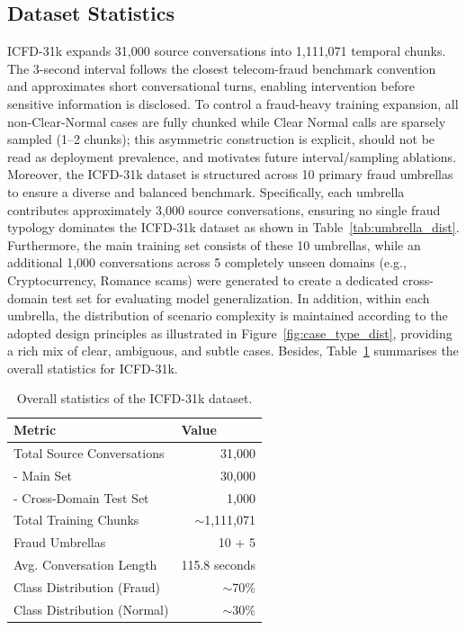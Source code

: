 \documentclass{article}
\newcommand{\crchange}[1]{{\color{blue}#1}}
\begin{document}
\subsection{Dataset Statistics}
\crchange{ICFD-31k expands 31,000 source conversations into 1,111,071 temporal chunks. The 3-second interval follows the closest telecom-fraud benchmark convention~\cite{Ma2025} and approximates short conversational turns, enabling intervention before sensitive information is disclosed. To control a fraud-heavy training expansion, all non-Clear-Normal cases are fully chunked while Clear Normal calls are sparsely sampled (1--2 chunks); this asymmetric construction is explicit, should not be read as deployment prevalence, and motivates future interval/sampling ablations.} Moreover, the ICFD-31k dataset is structured across 10 primary fraud umbrellas to ensure a diverse and balanced benchmark. Specifically, each umbrella contributes approximately 3,000 source conversations, ensuring no single fraud typology dominates the ICFD-31k dataset as shown in Table~\ref{tab:umbrella_dist}. Furthermore, the main training set consists of these 10 umbrellas, while an additional 1,000 conversations across 5 completely unseen domains (e.g., Cryptocurrency, Romance scams) were generated to create a dedicated cross-domain test set for evaluating model generalization. In addition, within each umbrella, the distribution of scenario complexity is maintained according to the adopted design principles as illustrated in Figure~\ref{fig:case_type_dist}, providing a rich mix of clear, ambiguous, and subtle cases. Besides, Table~\ref{tab:overall_stats} summarises the overall statistics for ICFD-31k.

\begin{table}[t]
\centering
\caption{Overall statistics of the ICFD-31k dataset.}
\label{tab:overall_stats}
\begin{tabular}{@{}lr@{}}
\toprule
Metric & \multicolumn{1}{l}{Value} \\ \midrule
Total Source Conversations & 31,000 \\
\quad - Main Set & 30,000 \\
\quad - Cross-Domain Test Set & 1,000 \\
Total Training Chunks & $\sim$1,111,071 \\
Fraud Umbrellas & 10 + 5 \\
Avg. Conversation Length & 115.8 seconds \\
Class Distribution (Fraud) & $\sim$70\% \\
Class Distribution (Normal) & $\sim$30\% \\ \bottomrule
\end{tabular}
\end{table}
\end{document}

